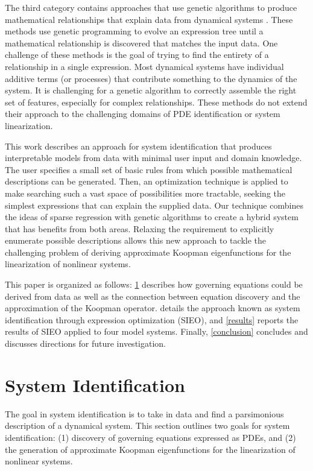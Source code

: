 \documentclass{article}
\begin{document}
The third category contains approaches that use genetic algorithms to produce mathematical relationships that explain data from dynamical systems \cite{hitoshi1995numerical,gray1998nonlinear,rodriequez2004identifying,madar2005genetic}. These methods use genetic programming to evolve an expression tree until a mathematical relationship is discovered that matches the input data. One challenge of these methods is the goal of trying to find the entirety of a relationship in a single expression. Most dynamical systems have individual additive terms (or processes) that contribute something to the dynamics of the system. It is challenging for a genetic algorithm to correctly assemble the right set of features, especially for complex relationships. These methods do not extend their approach to the challenging domains of PDE identification or system linearization.

This work describes an approach for system identification that produces interpretable models from data with minimal user input and domain knowledge. The user specifies a small set of basic rules from which possible mathematical descriptions can be generated. Then, an optimization technique is applied to make searching such a vast space of possibilities more tractable, seeking the simplest expressions that can explain the supplied data. Our technique combines the ideas of sparse regression with genetic algorithms to create a hybrid system that has benefits from both areas. Relaxing the requirement to explicitly enumerate possible descriptions allows this new approach to tackle the challenging problem of deriving approximate Koopman eigenfunctions for the linearization of nonlinear systems.

This paper is organized as follows: \cref{systemidentification} describes how governing equations could be derived from data as well as the connection between equation discovery and the approximation of the Koopman operator.  details the approach known as system identification through expression optimization (SIEO), and \cref{results} reports the results of SIEO applied to four model systems. Finally, \cref{conclusion} concludes and discusses directions for future investigation. 



\section{System Identification}
\label{systemidentification}

The goal in system identification is to take in data and find a parsimonious description of a dynamical system. This section outlines two goals for system identification: (1) discovery of governing equations expressed as PDEs, and (2) the generation of approximate Koopman eigenfunctions for the linearization of nonlinear systems.
\end{document}
